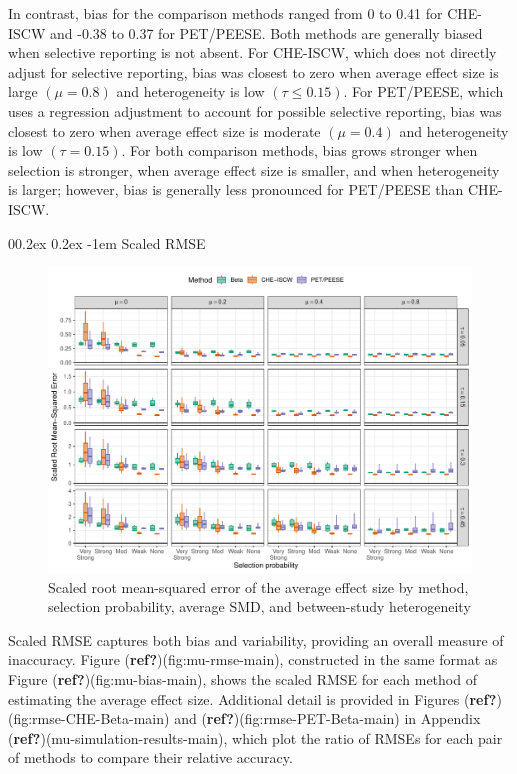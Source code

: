 \documentclass[
  american,
  man, donotrepeattitle,floatsintext]{apa7}
\makeatletter
\let\oldparagraph\paragraph
\renewcommand{\paragraph}{
    \@ifstar
      \xxxParagraphStar
      \xxxParagraphNoStar
  }
\newcommand{\xxxParagraphStar}[1]{\oldparagraph*{#1}\mbox{}}
\newcommand{\xxxParagraphNoStar}[1]{\oldparagraph{#1}\mbox{}}
\renewcommand{\paragraph}{\@startsection{paragraph}{4}{\parindent}%
  {0\baselineskip \@plus 0.2ex \@minus 0.2ex}%
  {-1em}%
  {\normalfont\normalsize\bfseries\itshape\typesectitle}}
\makeatother
\begin{document}
In contrast, bias for the comparison methods ranged from 0 to 0.41 for CHE-ISCW and -0.38 to 0.37 for PET/PEESE. Both methods are generally biased when selective reporting is not absent.
For CHE-ISCW, which does not directly adjust for selective reporting, bias was closest to zero when average effect size is large \((\mu = 0.8)\) and heterogeneity is low \((\tau \leq 0.15)\).
For PET/PEESE, which uses a regression adjustment to account for possible selective reporting, bias was closest to zero when average effect size is moderate \((\mu = 0.4)\) and heterogeneity is low \((\tau = 0.15)\).
For both comparison methods, bias grows stronger when selection is stronger, when average effect size is smaller, and when heterogeneity is larger; however, bias is generally less pronounced for PET/PEESE than CHE-ISCW.

\paragraph{Scaled RMSE}\label{scaled-rmse}

\begin{figure}
\includegraphics{beta-function-selection-models-with-dependent-effects_files/figure-latex/mu-rmse-main-1} \caption{Scaled root mean-squared error of the average effect size by method, selection probability, average SMD, and between-study heterogeneity}\label{fig:mu-rmse-main}
\end{figure}

Scaled RMSE captures both bias and variability, providing an overall measure of inaccuracy. Figure (\textbf{ref?})(fig:mu-rmse-main), constructed in the same format as Figure (\textbf{ref?})(fig:mu-bias-main), shows the scaled RMSE for each method of estimating the average effect size. Additional detail is provided in Figures (\textbf{ref?})(fig:rmse-CHE-Beta-main) and (\textbf{ref?})(fig:rmse-PET-Beta-main) in Appendix (\textbf{ref?})(mu-simulation-results-main), which plot the ratio of RMSEs for each pair of methods to compare their relative accuracy.
\end{document}
